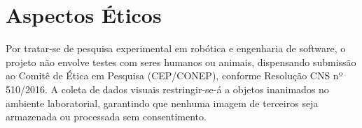 \section*{Aspectos Éticos}
Por tratar-se de pesquisa experimental em robótica e engenharia de software, o projeto não envolve testes com seres humanos ou animais, dispensando submissão ao Comitê de Ética em Pesquisa (CEP/CONEP), conforme Resolução CNS nº 510/2016. A coleta de dados visuais restringir-se-á a objetos inanimados no ambiente laboratorial, garantindo que nenhuma imagem de terceiros seja armazenada ou processada sem consentimento.